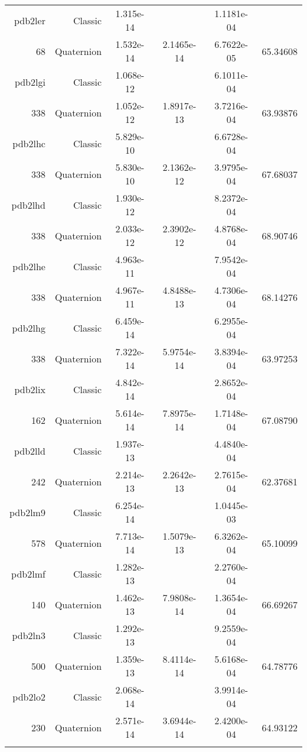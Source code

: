 \begin{xltabular}{\textwidth}{r|rS[table-format=1.3e+2]S[table-format=1.4e+2]S[table-format=1.4e+2]S[table-format=-1.5]}
pdb2ler & Classic & 1.315e-14 &  & 1.1181e-04 & \\
68 & Quaternion & 1.532e-14 & 2.1465e-14 & 6.7622e-05 & 65.34608\\  \addlinespace
pdb2lgi & Classic & 1.068e-12 &  & 6.1011e-04 & \\
338 & Quaternion & 1.052e-12 & 1.8917e-13 & 3.7216e-04 & 63.93876\\  \addlinespace
pdb2lhc & Classic & 5.829e-10 &  & 6.6728e-04 & \\
338 & Quaternion & 5.830e-10 & 2.1362e-12 & 3.9795e-04 & 67.68037\\  \addlinespace
pdb2lhd & Classic & 1.930e-12 &  & 8.2372e-04 & \\
338 & Quaternion & 2.033e-12 & 2.3902e-12 & 4.8768e-04 & 68.90746\\  \addlinespace
pdb2lhe & Classic & 4.963e-11 &  & 7.9542e-04 & \\
338 & Quaternion & 4.967e-11 & 4.8488e-13 & 4.7306e-04 & 68.14276\\  \addlinespace
pdb2lhg & Classic & 6.459e-14 &  & 6.2955e-04 & \\
338 & Quaternion & 7.322e-14 & 5.9754e-14 & 3.8394e-04 & 63.97253\\  \addlinespace
pdb2lix & Classic & 4.842e-14 &  & 2.8652e-04 & \\
162 & Quaternion & 5.614e-14 & 7.8975e-14 & 1.7148e-04 & 67.08790\\  \addlinespace
pdb2lld & Classic & 1.937e-13 &  & 4.4840e-04 & \\
242 & Quaternion & 2.214e-13 & 2.2642e-13 & 2.7615e-04 & 62.37681\\  \addlinespace
pdb2lm9 & Classic & 6.254e-14 &  & 1.0445e-03 & \\
578 & Quaternion & 7.713e-14 & 1.5079e-13 & 6.3262e-04 & 65.10099\\  \addlinespace
pdb2lmf & Classic & 1.282e-13 &  & 2.2760e-04 & \\
140 & Quaternion & 1.462e-13 & 7.9808e-14 & 1.3654e-04 & 66.69267\\  \addlinespace
pdb2ln3 & Classic & 1.292e-13 &  & 9.2559e-04 & \\
500 & Quaternion & 1.359e-13 & 8.4114e-14 & 5.6168e-04 & 64.78776\\  \addlinespace
pdb2lo2 & Classic & 2.068e-14 &  & 3.9914e-04 & \\
230 & Quaternion & 2.571e-14 & 3.6944e-14 & 2.4200e-04 & 64.93122\\  \addlinespace

\end{xltabular}
